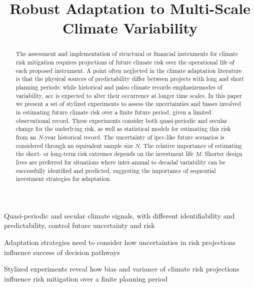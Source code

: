 \documentclass[
  draft,
  linenumbers
]{agujournal2019}
\begin{document}
\title{Robust Adaptation to Multi-Scale Climate Variability}

\begin{keypoints}
  \item Quasi-periodic and secular climate signals, with different identifiability and predictability, control future uncertainty and risk
  \item Adaptation strategies need to consider how uncertainties in risk projections influence success of decision pathways
  \item Stylized experiments reveal how bias and variance of climate risk projections influence risk mitigation over a finite planning period
\end{keypoints}

\begin{abstract}
  The assessment and implementation of structural or financial instruments for climate risk mitigation requires projections of future climate risk over the operational life of each proposed instrument.
  A point often neglected in the climate adaptation literature is that the physical sources of predictability differ between projects with long and short planning periods: while historical and paleo climate records emphasizemodes of variability, \acrlong{acc} is expected to alter their occurrence at longer time scales.
  In this paper we present a set of stylized experiments to assess the uncertainties and biases involved in estimating future climate risk over a finite future period, given a limited observational record.
  These experiments consider both quasi-periodic and secular change for the underlying risk, as well as statistical models for estimating this risk from an $N$-year historical record.
  The uncertainty of \acrshort{ipcc}-like future scenarios is considered through an equivalent sample size $N$. 
  The relative importance of estimating the short- or long-term risk extremes depends on the investment life $M$.
  Shorter design lives are preferred for situations where inter-annual to decadal variability can be successfully identified and predicted, suggesting the importance of sequential investment strategies for adaptation.
\end{abstract}
\end{document}
